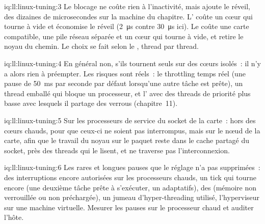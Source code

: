 \begin{solution}{iq:ll:linux-tuning:3}
Le blocage ne coûte rien à l'inactivité, mais ajoute le réveil, des dizaines de microsecondes sur la machine du chapitre. L' coûte
un cœur qui tourne à vide et économise le réveil (\qty{2}{\micro\second} contre \qty{30}{\micro\second} ici). Le  coûte
une carte compatible, une pile réseau séparée et un cœur qui tourne à vide, et retire le noyau du chemin. Le choix se fait selon le ,
thread par thread.
\end{solution}

\begin{solution}{iq:ll:linux-tuning:4}
En général non, s'ils tournent seuls sur des cœurs isolés~: il n'y a alors rien à préempter. Les risques sont réels~: le throttling temps réel (une pause de
\qty{50}{\milli\second} par seconde par défaut lorsqu'une autre tâche est prête), un thread emballé qui bloque un processeur, et l' avec des threads de priorité plus basse avec lesquels il partage des verrous
(chapitre~11).
\end{solution}

\begin{solution}{iq:ll:linux-tuning:5}
Sur les processeurs de service du socket de la carte~: hors des cœurs chauds, pour que ceux-ci ne soient pas interrompus, mais sur le nœud de
la carte, afin que le travail du noyau sur le paquet reste dans le cache partagé du socket, près des threads qui le lisent, et ne
traverse pas l'interconnexion.
\end{solution}

\begin{solution}{iq:ll:linux-tuning:6}
Les rares et longues pauses que le réglage n'a pas supprimées~: des interruptions encore autorisées sur les processeurs chauds, un tick qui tourne encore (une
deuxième tâche prête à s'exécuter, un  adaptatifs), des  (mémoire non verrouillée ou non préchargée), un jumeau d'hyper-threading utilisé,
l'hyperviseur sur une machine virtuelle. Mesurer les pauses sur le processeur chaud et auditer l'hôte.
\end{solution}
